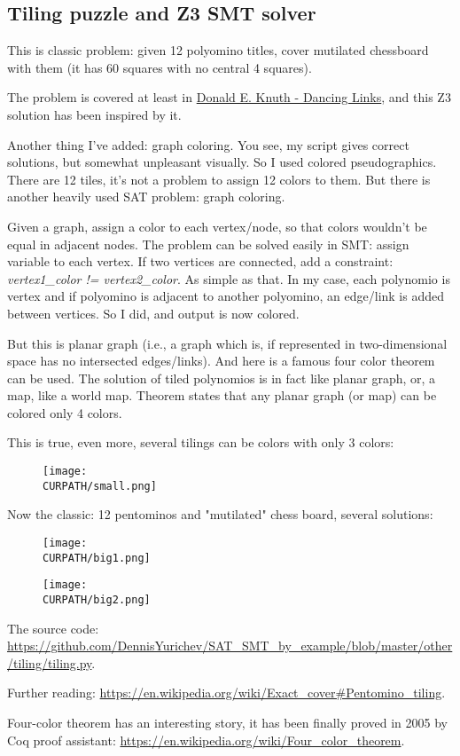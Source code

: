 \subsection{Tiling puzzle and Z3 SMT solver}
\label{tiling_Z3}

\renewcommand{\CURPATH}{other/tiling}

This is classic problem: given 12 polyomino titles, cover mutilated chessboard with them (it has 60 squares with no central 4 squares).

The problem is covered at least in \href{https://arxiv.org/pdf/cs/0011047.pdf}{Donald E. Knuth - Dancing Links},
and this Z3 solution has been inspired by it.

Another thing I've added: graph coloring. You see, my script gives correct solutions, but somewhat unpleasant visually.
So I used colored pseudographics. There are 12 tiles, it's not a problem to assign 12 colors to them.
But there is another heavily used SAT problem: graph coloring.

Given a graph, assign a color to each vertex/node, so that colors wouldn't be equal in adjacent nodes.
The problem can be solved easily in SMT: assign variable to each vertex.
If two vertices are connected, add a constraint: \textit{vertex1\_color != vertex2\_color}.
As simple as that.
In my case, each polynomio is vertex and if polyomino is adjacent to another polyomino, an edge/link is added between vertices.
So I did, and output is now colored.

But this is planar graph (i.e., a graph which is, if represented in two-dimensional space has no intersected edges/links).
And here is a famous four color theorem can be used.
The solution of tiled polynomios is in fact like planar graph, or, a map, like a world map.
Theorem states that any planar graph (or map) can be colored only 4 colors.

This is true, even more, several tilings can be colors with only 3 colors:

\begin{figure}[H]
\centering
\texttt{[image: \\CURPATH/small.png]}
\caption{}
\end{figure}

Now the classic: 12 pentominos and "mutilated" chess board, several solutions:

\begin{figure}[H]
\centering
\texttt{[image: \\CURPATH/big1.png]}
\caption{}
\end{figure}

\begin{figure}[H]
\centering
\texttt{[image: \\CURPATH/big2.png]}
\caption{}
\end{figure}

The source code: \url{https://github.com/DennisYurichev/SAT_SMT_by_example/blob/master/other/tiling/tiling.py}.

Further reading: \url{https://en.wikipedia.org/wiki/Exact_cover#Pentomino_tiling}.

Four-color theorem has an interesting story, it has been finally proved in 2005 by Coq proof assistant:
\url{https://en.wikipedia.org/wiki/Four_color_theorem}.

